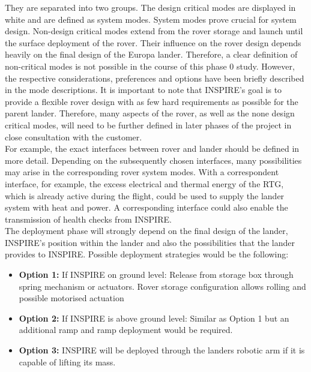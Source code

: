 They are separated into two groups. The design critical modes are displayed in white and are defined as system modes. System modes prove crucial for system design. Non-design critical modes extend from the rover storage and launch until the surface deployment of the rover. Their influence on the rover design depends heavily on the final design of the Europa lander. Therefore, a clear definition of non-critical modes is not possible in the course of this phase 0 study. However, the respective considerations, preferences and options have been briefly described in the mode descriptions. It is important to note that INSPIRE's goal is to provide a flexible rover design with as few hard requirements as possible for the parent lander. Therefore, many aspects of the rover, as well as the none design critical modes, will need to be further defined in later phases of the project in close consultation with the customer. \\
For example, the exact interfaces between rover and lander should be defined in more detail. Depending on the subsequently chosen interfaces, many possibilities may arise in the corresponding rover system modes. With a correspondent interface, for example, the excess electrical and thermal energy of the RTG, which is already active during the flight, could be used to supply the lander system with heat and power. A corresponding interface could also enable the transmission of health checks from INSPIRE. \\
The deployment phase will strongly depend on the final design of the lander, INSPIRE's position within the lander and also the possibilities that the lander provides to INSPIRE.
Possible deployment strategies would be the following:

\begin{itemize}
\itemsep0pt
\item	\textbf{Option 1:} If INSPIRE on ground level: Release from storage box through spring mechanism or actuators. Rover storage configuration allows rolling and possible motorised actuation
\item	\textbf{Option 2:} If INSPIRE is above ground level: Similar as Option 1 but an additional ramp and ramp deployment would be required.
\item	\textbf{Option 3:} INSPIRE will be deployed through the landers robotic arm if it is capable of lifting its mass.
\end{itemize}
